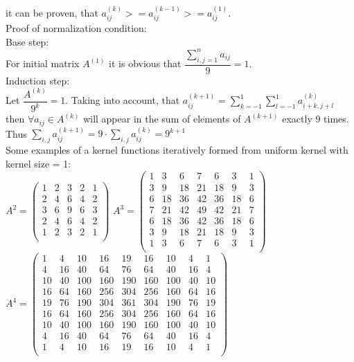 it can be proven, that $a_{ij}^{(k)} >= a_{ij}^{(k-1)} >= a_{ij}^{(1)}$.\\
Proof of normalization condition: \\
Base step:\\ 
For initial matrix $A^{(1)}$ it is obvious that $\dfrac{\sum_{i,j = 1}^{n}{a_{ij}}}{9} = 1$.\\
Induction step: \\
Let $\dfrac{A^{(k)}}{9^k} = 1$. Taking into account, that $a_{ij}^{(k+1)} = \sum_{k=-1}^{1}{\sum_{l=-1}^{1}{a^{(k)}_{i+k, j+l}}}$ then $\forall a_{ij} \in A^{(k)}$ will appear in the sum of elements of $A^{(k+1)}$ exactly 9 times. Thus $\sum_{i,j}{a_{ij}^{(k+1)}} = 9 \cdot \sum_{i,j}{a_{ij}^{(k)}} = 9^{k+1}$\\
Some examples of a kernel functions iteratively formed from uniform kernel with kernel size = 1:\\
$A^2 = 
\begin{pmatrix}
1 & 2 & 3 & 2 & 1\\
2 & 4 & 6 & 4 & 2\\
3 & 6 & 9 & 6 & 3\\
2 & 4 & 6 & 4 & 2\\
1 & 2 & 3 & 2 & 1\\
\end{pmatrix}$
$A^3 = 
\begin{pmatrix}
 1 & 3 & 6 & 7 & 6 & 3 & 1\\
 3 & 9 & 18 & 21 & 18 & 9 & 3\\
 6 & 18 & 36 & 42 & 36 & 18 & 6\\
 7 & 21 & 42 & 49 & 42 & 21 & 7\\
 6 & 18 & 36 & 42 & 36 & 18 & 6\\
 3 & 9 & 18 & 21 & 18 & 9 & 3\\
 1 & 3 & 6 & 7 & 6 & 3 & 1\\
\end{pmatrix}$\\
$A^4 = 
\begin{pmatrix}
1 & 4 & 10 & 16 & 19 & 16 & 10 & 4 & 1\\
4 & 16 & 40 & 64 & 76 & 64 & 40 & 16 & 4\\
10 & 40 & 100 & 160 & 190 & 160 & 100 & 40 & 10\\
16 & 64 & 160 & 256 & 304 & 256 & 160 & 64 & 16\\
19 & 76 & 190 & 304 & 361 & 304 & 190 & 76 & 19\\
16 & 64 & 160 & 256 & 304 & 256 & 160 & 64 & 16\\
10 & 40 & 100 & 160 & 190 & 160 & 100 & 40 & 10\\
4 & 16 & 40 & 64 & 76 & 64 & 40 & 16 & 4\\
1 & 4 & 10 & 16 & 19 & 16 & 10 & 4 & 1\\
\end{pmatrix}$\\
